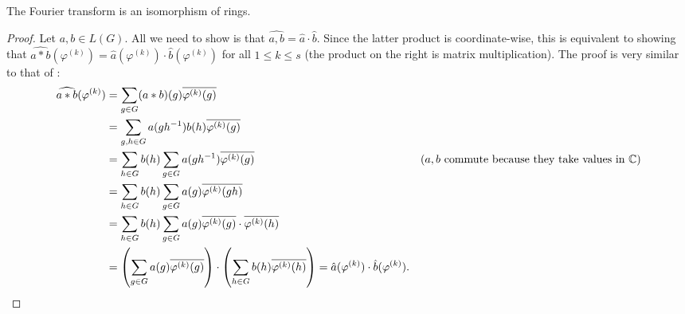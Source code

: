 		\begin{ftheo}
			\label{wedderburns theorem}
			The Fourier transform is an isomorphism of rings.
		\end{ftheo}
		\begin{proof}
			Let $a,b \in L(G)$. All we need to show is that $\widehat{a,b} = \hat{a} \cdot \hat{b}$. Since the latter product is coordinate-wise, this is equivalent to showing that $\widehat{a*b}(\varphi^{(k)}) = \hat{a}(\varphi^{(k)}) \cdot \hat{b}(\varphi^{(k)})$ for all $1 \le k \le s$ (the product on the right is matrix multiplication). The proof is very similar to that of :
			\begin{align*}
				\widehat{a*b}(\varphi^{(k)}) &= \sum_{g \in G} (a*b)(g) \overline{\varphi^{(k)}(g)} \\
					&= \sum_{g,h \in G} a(gh^{-1}) b(h) \overline{\varphi^{(k)}(g)} \\
					&= \sum_{h \in G} b(h) \sum_{g \in G} a(gh^{-1}) \overline{\varphi^{(k)}(g)} & \text{($a,b$ commute because they take values in $\mathbb{C}$)} \\
					&= \sum_{h \in G} b(h) \sum_{g \in G} a(g) \overline{\varphi^{(k)}(gh)} \\
					&= \sum_{h \in G} b(h) \sum_{g \in G} a(g) \overline{\varphi^{(k)}(g)} \cdot \overline{\varphi^{(k)}(h)} \\
					&= \left(\sum_{g \in G} a(g) \overline{\varphi^{(k)}(g)}\right) \cdot \left(\sum_{h \in G} b(h) \overline{\varphi^{(k)}(h)}\right) = \hat{a}(\varphi^{(k)}) \cdot \hat{b}(\varphi^{(k)}). & \qedhere
			\end{align*}
		\end{proof}